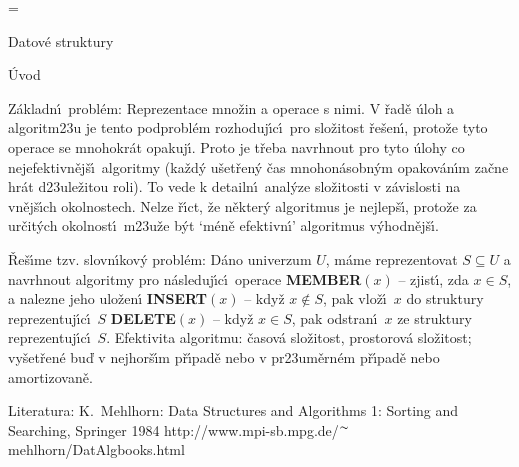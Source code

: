 



\magnification=
\pagewidth{5.5in}
\pageheight{19.5cm}


\def \emph#1{\underbar{#1}}
\def \Prob{\operatorname{Prob}}
\def \var{\operatorname{var}}

\heading
Datov\'e struktury
\endheading

\subhead
\'Uvod
\endsubhead

\flushpar Z\'akladn\'\i\ probl\'em: Reprezentace mno\v zin a 
operace s nimi. V \v rad\v e \'uloh a algoritm\accent23u je tento 
podprobl\'em rozhoduj\'\i c\'\i\ pro slo\v zitost \v re\v sen\'\i , proto\v ze 
tyto operace se mnohokr\'at opakuj\'\i . Proto je t\v reba 
navrhnout pro tyto \'ulohy co nejefektivn\v ej\v s\'\i\ algoritmy 
(ka\v zd\'y u\v set\v ren\'y \v cas mnohon\'asobn\'ym opakov\'an\'\i m za\v cne 
hr\'at d\accent23ule\v zitou roli). To vede k detailn\'\i\ 
anal\'yze slo\v zitosti v z\'avislosti na vn\v ej\v s\'\i ch okolnostech. 
Nelze \v r\'\i ct, 
\v ze n\v ekter\'y algoritmus je nejlep\v s\'\i , proto\v ze za ur\v cit\'ych 
okolnost\'\i\ m\accent23u\v ze b\'yt `m\'en\v e efektivn\'\i ' algoritmus 
v\'yhodn\v ej\v s\'\i .
\medskip

\flushpar \v Re\v s\'\i me tzv. slovn\'\i kov\'y probl\'em: D\'ano 
univerzum $U$, m\'ame reprezentovat $S\subseteq U$ a navrhnout algoritmy pro 
n\'asle\-duj\'\i c\'\i\ operace\newline 
{\bf MEMBER$\left(x\right)$} -- zjist\'\i , zda $x\in S$, a nalezne jeho 
ulo\v zen\'\i\newline 
{\bf INSERT$\left(x\right)$} -- kdy\v z $x\notin S$, pak vlo\v z\'\i\ $x$ do struktury 
repre\-zentuj\'\i c\'\i\ $S$\newline 
{\bf DELETE$\left(x\right)$} -- kdy\v z $x\in S$, pak odstran\'\i\ $x$ ze struktury 
reprezentuj\'\i c\'\i\ $S$.\newline 
Efektivita algoritmu: \v casov\'a slo\v zitost, prostorov\'a 
slo\v zitost;\newline 
vy\-\v set\v ren\'e bu\v d v nejhor\v s\'\i m p\v r\'\i pad\v e nebo v 
pr\accent23um\v ern\'em p\v r\'\i pad\v e nebo amortizovan\v e.
\medskip

\flushpar Literatura:\newline 
K.~Mehlhorn: Data Structures and Algorithms 1: Sorting 
and Searching, Springer 1984\newline 
http://www.mpi-sb.mpg.de/$^{\thicksim}$mehlhorn/DatAlgbooks.html
\smallskip

